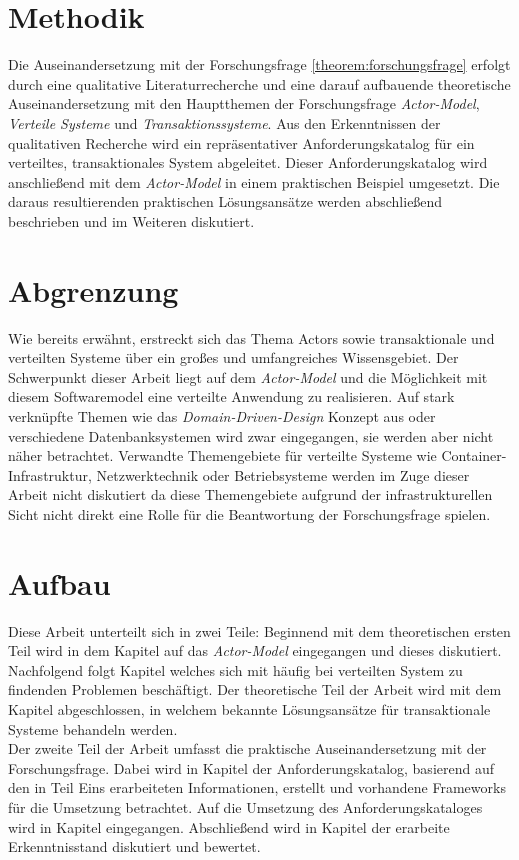 \section{Methodik}
Die Auseinandersetzung mit der Forschungsfrage \ref{theorem:forschungsfrage} erfolgt durch eine qualitative Literaturrecherche und eine darauf aufbauende theoretische Auseinandersetzung mit den Hauptthemen der Forschungsfrage \textit{Actor-Model}, \textit{Verteile Systeme} und \textit{Transaktionssysteme}. Aus den Erkenntnissen der qualitativen Recherche wird ein repräsentativer Anforderungskatalog für ein verteiltes, transaktionales System abgeleitet. Dieser Anforderungskatalog wird anschließend mit dem \textit{Actor-Model} in einem praktischen Beispiel umgesetzt. Die daraus resultierenden praktischen Lösungsansätze werden abschließend beschrieben und im Weiteren diskutiert.
 
\section{Abgrenzung}
Wie bereits erwähnt, erstreckt sich das Thema Actors sowie transaktionale und verteilten Systeme über ein großes und umfangreiches Wissensgebiet. Der Schwerpunkt dieser Arbeit liegt auf dem \textit{Actor-Model} und die Möglichkeit mit diesem Softwaremodel eine verteilte Anwendung zu realisieren. Auf stark verknüpfte Themen wie das \textit{Domain-Driven-Design} Konzept aus \cite{Evans2004Domain-drivenSoftware} oder verschiedene Datenbanksystemen wird zwar eingegangen, sie werden aber nicht näher betrachtet. Verwandte Themengebiete für verteilte Systeme wie Container-Infrastruktur, Netzwerktechnik oder Betriebsysteme werden im Zuge dieser Arbeit nicht diskutiert da diese Themengebiete aufgrund der infrastrukturellen Sicht nicht direkt eine Rolle für die Beantwortung der Forschungsfrage spielen. 

\section{Aufbau}
Diese Arbeit unterteilt sich in zwei Teile: Beginnend mit dem theoretischen ersten Teil wird in dem Kapitel  auf das \textit{Actor-Model} eingegangen und dieses diskutiert. Nachfolgend folgt Kapitel  welches sich mit häufig bei verteilten System zu findenden Problemen beschäftigt. Der theoretische Teil der Arbeit wird mit dem Kapitel  abgeschlossen, in welchem bekannte Lösungsansätze für transaktionale Systeme behandeln werden. \\
Der zweite Teil der Arbeit umfasst die praktische Auseinandersetzung mit der Forschungsfrage. Dabei wird in Kapitel  der Anforderungskatalog, basierend auf den in Teil Eins erarbeiteten Informationen, erstellt und vorhandene Frameworks für die Umsetzung betrachtet. Auf die Umsetzung des Anforderungskataloges wird in Kapitel  eingegangen. Abschließend wird in Kapitel  der erarbeite Erkenntnisstand diskutiert und bewertet. 
